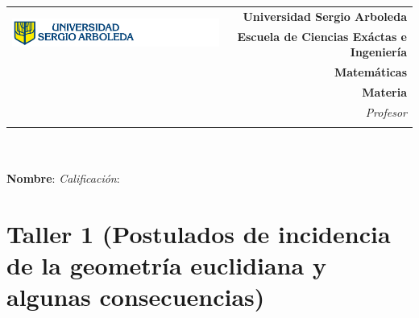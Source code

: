 \documentclass[12pt,letterpaper]{exam}
\newcommand{\base}[1]{\underline{\hspace{#1}}}
\newcommand{\uni}{Universidad Sergio Arboleda}
\newcommand{\fac}{\normalsize{Escuela de Ciencias Ex\'actas e Ingenier\'ia}}
\newcommand{\dep}{Matem\'aticas}
\newcommand{\mat}{Materia} %
\newcommand{\tema}{} %
\newcommand{\autor}{Profesor}%
\begin{document}
\begin{tabular}{lr}
    \multirow{2}{*}{\includegraphics[height=1.4cm]{logosergio.png}} &
    {\textbf{\uni}} \\
    & {\textbf{\fac}} \\
    & {\textbf{\dep}} \\
    & {\textbf{\mat \tema}} \\
    & {\textit{\autor}} \\
    & {\textit{}}
\end{tabular}\\
\base{19.5cm}\\
\textbf{Nombre}:  \quad 
\textit{Calificaci\'on}: \base{2cm} \\[6pt]

\section*{Taller 1 (Postulados de incidencia de la geometr\'ia euclidiana y algunas consecuencias)}
\end{document}

